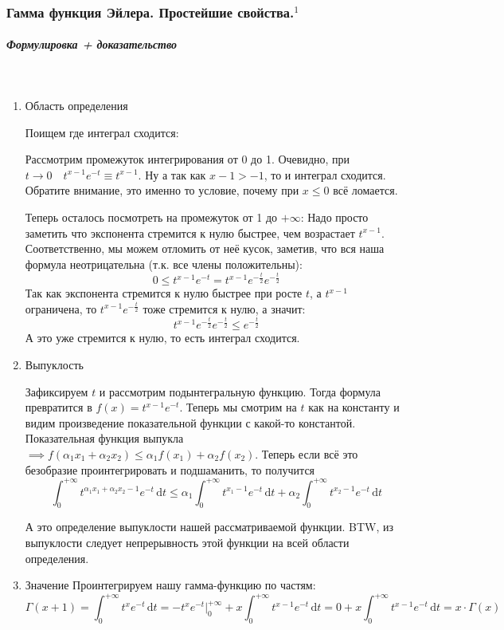 \documentclass{article}
\def\D{\,\mathrm{d}}
\let\vanillasubparagraph\subparagraph
\renewcommand{\subparagraph}[1]{\vanillasubparagraph{#1}\mbox{}\\}
\begin{document}
\subsubsection{Гамма функция Эйлера. Простейшие свойства.\texorpdfstring{$^1$}{}}
\subparagraph{Формулировка + доказательство}
\begin{enumerate}
    \item Область определения
    
    Поищем где интеграл сходится:
    
    Рассмотрим промежуток интегрирования от 0 до 1. Очевидно, при $t\rightarrow 0 \quad t^{x-1} e^{-t} \equiv t^{x-1}$. Ну а так как $x-1 > -1$, то и интеграл сходится. Обратите внимание, это именно то условие, почему при $x \le 0$ всё ломается.
    
    Теперь осталось посмотреть на промежуток от 1 до $+\infty$:
    Надо просто заметить что экспонента стремится к нулю быстрее, чем возрастает $t^{x-1}$. Соответственно, мы можем отломить от неё кусок, заметив, что вся наша формула неотрицательна (т.к. все члены положительны):
    $$
    0 \le t^{x-1} e^{-t} = t^{x-1} e^{-\frac t2} e^{-\frac t2}
    $$
    Так как экспонента стремится к нулю быстрее при росте $t$, а $t^{x-1}$ ограничена, то $t^{x-1} e^{-\frac t2}$ тоже стремится к нулю, а значит:
    $$
    t^{x-1} e^{-\frac t2} e^{-\frac t2} \le e^{-\frac t2}
    $$
    А это уже стремится к нулю, то есть интеграл сходится.
    
    
    \item Выпуклость
    
    Зафиксируем $t$ и рассмотрим подынтегральную функцию. Тогда формула превратится в $f(x) = t^{x-1}e^{-t}$. Теперь мы смотрим на $t$ как на константу и видим произведение показательной функции с какой-то константой. Показательная функция выпукла $\implies f(\alpha_1 x_1 + \alpha_2 x_2) \le \alpha_1 f(x_1) + \alpha_2 f(x_2)$. Теперь если всё это безобразие проинтегрировать и подшаманить, то получится $$
    \int^{+\infty}_0 t^{\alpha_1 x_1 + \alpha_2 x_2 -1} e^{-t} \D t \le \alpha_1 \int^{+\infty}_0 t^{x_1-1} e^{-t} \D t + \alpha_2 \int^{+\infty}_0 t^{x_2-1} e^{-t} \D t
    $$
    
    А это определение выпуклости нашей рассматриваемой функции. BTW, из выпуклости следует непрерывность этой функции на всей области определения.
    
    \item Значение
    Проинтегрируем нашу гамма-функцию по частям:
    $$
    \Gamma(x+1) = \int^{+\infty}_0 t^{x} e^{-t} \D t = -t^x e^{-t} |^{+\infty}_0 + x\int^{+\infty}_0 t^{x-1} e^{-t} \D t = 0 + x\int^{+\infty}_0 t^{x-1} e^{-t} \D t = x\cdot \Gamma(x)
    $$
    

\end{enumerate}
\end{document}

